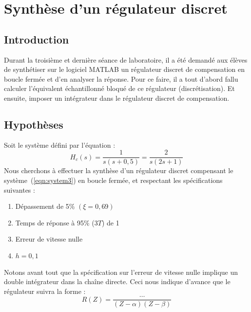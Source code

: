 \chapter{Synthèse d'un régulateur discret}

\section{Introduction}
Durant la troisième et dernière séance de laboratoire, il a été demandé aux élèves de synthétiser sur le logiciel MATLAB\textregistered{} un régulateur discret de compensation en boucle fermée et d'en analyser la réponse.
Pour ce faire, il a tout d'abord fallu calculer l'équivalent échantillonné bloqué de ce régulateur (discrétisation).
Et ensuite, imposer un intégrateur dans le régulateur discret de compensation.

\section{Hypothèses}
Soit le système défini par l'équation :
\begin{equation}
    H_c(s) = \frac{1}{s\left( s+0,5\right)}
           = \frac{2}{s\left(2s+1  \right)}
    \label{eqn:system3}
\end{equation}
Nous cherchons à effectuer la synthèse d'un régulateur discret compensant le système~(\ref{eqn:system3}) en boucle fermée, et respectant les spécifications suivantes :
\begin{enumerate}
    \item Dépassement de 5\% $(\xi=0,69)$
    \item Temps de réponse à 95\% ($3T$) de 1
    \item Erreur de vitesse nulle
    \item $h = 0,1$
\end{enumerate}
Notons avant tout que la spécification sur l'erreur de vitesse nulle implique un double intégrateur dans la chaîne directe.
Ceci nous indique d'avance que le régulateur suivra la forme :
\begin{equation}
    R(Z) = \frac{\dots}{(Z-\alpha)(Z-\beta)}
\end{equation}


